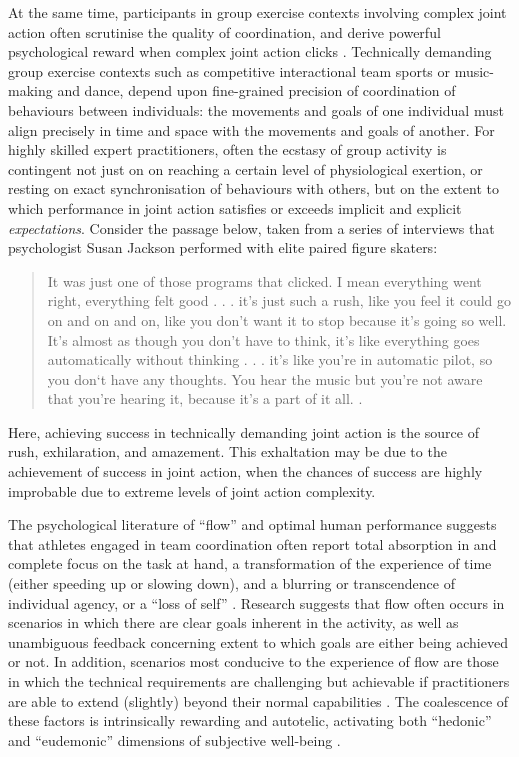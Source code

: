 \begin{CJK}{UTF8}{gbsn}
At the same time, participants in group exercise contexts involving complex joint action often scrutinise the quality of coordination, and derive powerful psychological reward when complex joint action clicks \citep{Jackson1992}.  Technically demanding group exercise contexts such as competitive interactional team sports or music-making and dance, depend upon fine-grained precision of coordination of behaviours between individuals: the movements and goals of one individual must align precisely in time and space with the movements and goals of another.  For highly skilled expert practitioners, often the ecstasy of group activity is contingent not just on on reaching a certain level of physiological exertion, or resting on exact synchronisation of behaviours with others, but on the extent to which performance in joint action satisfies or exceeds implicit and explicit \textit{expectations}.  Consider the passage below, taken from a series of interviews that psychologist Susan Jackson performed with elite paired figure skaters:
  \begin{quote}
    It was just one of those programs that clicked. I mean everything went right, everything felt good . . . it's just such a rush, like you feel it could go on and on and on, like you don't want it to stop because it's going so well.  It's almost as though you don't have to think, it's like everything goes automatically without thinking . . . it's like you're in automatic pilot, so you don‘t have any thoughts.  You hear the music but you're not aware that you're hearing it, because it's a part of it all. \citep[168]{Jackson1992}.
  \end{quote}

Here, achieving success in technically demanding joint action is the source of rush, exhilaration, and amazement.  This exhaltation may be due to the achievement of success in joint action, when the chances of success are highly improbable due to extreme levels of joint action complexity.

The psychological literature of ``flow'' and optimal human performance \citep[see][]{Csikszentmihalyi1992} suggests that athletes engaged in team coordination often report total absorption in and complete focus on the task at hand, a transformation of the experience of time (either speeding up or slowing down), and a blurring or transcendence of individual agency, or a ``loss of self''   \citep{Csikszentmihalyi1992,Jackson1995,Jackson1999,McNeill1995}.  Research suggests that flow often occurs in scenarios in which there are clear goals inherent in the activity, as well as unambiguous feedback concerning extent to which goals are either being achieved or not.  In addition, scenarios most conducive to the experience of flow are those in which the technical requirements are challenging but achievable if practitioners are able to extend (slightly) beyond their normal capabilities \citep{Fong2015}.
The coalescence of these factors is intrinsically rewarding and autotelic, activating both ``hedonic'' and ``eudemonic'' dimensions of subjective well-being \citep{Huta2010,Fave2009}.


\end{CJK}
